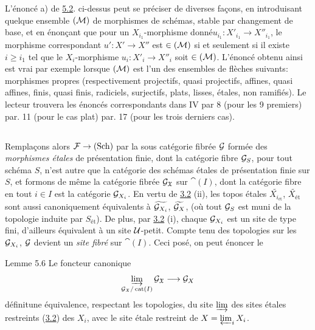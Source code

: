 \documentclass[10pt]{../fichiers-configuration-latex/smfart}
\begin{document}
L'énoncé a) de \hyperref[VII.subsec5.2]{5.2}. ci-dessus peut se préciser de diverses façons,
en introduisant quelque ensemble $({\mathcal M})$ de morphismes de
schémas, stable par changement de base, et en énonçant que pour un
$X_{i_1}$-morphisme donné\pageoriginale $u_{i_1} : X'_{i_1} \to
X''_{i_1}$, le
morphisme correspondant $u': X'\to X''$ est $\in
({\mathcal M})$ si et seulement si il existe $i\geq i_{1}$ tel que le
$X_{i}$-morphisme $u_{i}:X'_{i}\to X''_{i}$ soit $\in
({\mathcal M})$. L'énoncé obtenu ainsi est vrai par exemple lorsque
$({\mathcal M})$ est l'un des ensembles de flèches suivants: morphismes
propres (respectivement projectifs, \resp quasi projectifs, \resp affines, \resp quasi affines, \resp finis, \resp quasi finis, \resp
radiciels, \resp surjectifs, \resp plats, \resp lisses, \resp étales,
\resp non ramifiés). Le lecteur trouvera les énoncés correspondants
dans \EGA IV par 8 (pour les 9 premiers) par. 11 (pour le cas plat) par.
17 (pour les trois derniers cas).

\subsection{}

Remplaçons alors $\Ff \to (\Sch)$ par la sous catégorie
fibrée ${\mathcal G}$ formée des \emph{morphismes étales} de
présentation finie, dont la catégorie fibre ${\mathcal G}_{S}$, pour
tout schéma $S$, n'est autre que la catégorie des schémas étales de
présentation finie sur $S$, et formons de même la catégorie fibrée
${\mathcal G}_{\mathfrak{X}}$ sur $\cat(I)$, dont la catégorie fibre en
tout $i \in I$ est la catégorie ${\mathcal G}_{X_i}$. En vertu de \hyperref[VII.cor3.2]{3.2}
(ii), les topos étales $\widetilde{X_{i_{\text{ét}}}}$,
$\widetilde{X_{\text{ét}}}$ sont aussi canoniquement équivalents à
$\widetilde{{\mathcal G}_{X_{i}}}$,
$\widetilde{{\mathcal G}_{X}}$, (où tout ${\mathcal G}_S$ est muni
de la topologie induite par $S_{\text{ét}}$). De plus, par \hyperref[VII.cor3.2]{3.2} (i), chaque
${\mathcal G}_{X_i}$ est un site de type fini, d'ailleurs équivalent à
un site ${\mathcal U}$-petit. Compte tenu des topologies sur les
${\mathcal G}_{X_i}$, ${\mathcal G}$ devient un \emph{site fibré} sur
$\cat(I)$. Ceci posé, on peut énoncer le

\begin{enonce*}{Lemme 5.6}
Le foncteur canonique
$$
\varinjlim_{\Gg_{\mathfrak{X}}/\cat(I)}
\Gg_{\mathfrak{X}} \to \Gg_X
$$
définit\pageoriginale une équivalence, respectant les topologies, du site
$\varinjlim$ des sites étales restreints (\hyperref[VII.cor3.2]{3.2}) des $X_i$, avec le site
étale restreint de $X = \varprojlim_i X_i$.
\end{enonce*}
\end{document}
